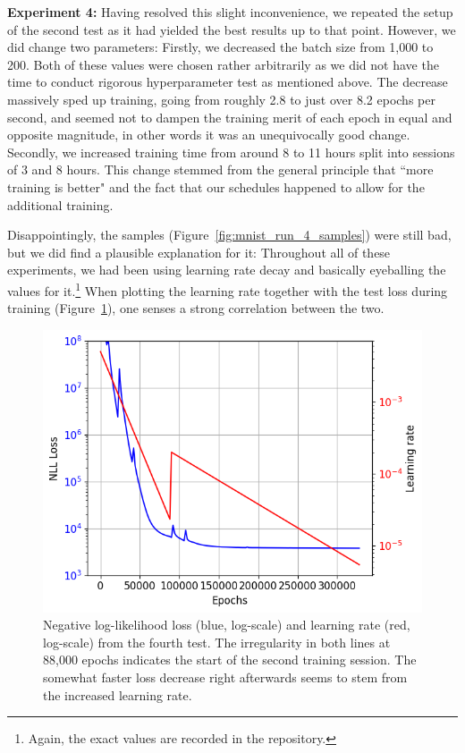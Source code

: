 \textbf{Experiment 4:} Having resolved this slight inconvenience, we repeated the setup of the second test as it had yielded the best results up to that point. However, we did change two parameters: Firstly, we decreased the batch size from 1,000 to 200. Both of these values were chosen rather arbitrarily as we did not have the time to conduct rigorous hyperparameter test as mentioned above. The decrease massively sped up training, going from roughly 2.8 to just over 8.2 epochs per second, and seemed not to dampen the training merit of each epoch in equal and opposite magnitude, in other words it was an unequivocally good change. Secondly, we increased training time from around 8 to 11 hours split into sessions of 3 and 8 hours. This change stemmed from the general principle that ``more training is better" and the fact that our schedules happened to allow for the additional training.

Disappointingly, the samples (Figure~\ref{fig:mnist_run_4_samples}) were still bad, but we did find a plausible explanation for it: Throughout all of these experiments, we had been using learning rate decay and basically eyeballing the values for it.\footnote{Again, the exact values are recorded in the repository.} When plotting the learning rate together with the test loss during training (Figure~\ref{fig:mnist_run_4_loss_vs_lr}), one senses a strong correlation between the two.

\begin{figure}
\centering
\includegraphics[width=.65\textwidth]{images/mnist_maxpooling/run_4_loss_vs_lr.png}
\caption{Negative log-likelihood loss (blue, log-scale) and learning rate (red, log-scale) from the fourth test. The irregularity in both lines at 88,000 epochs indicates the start of the second training session. The somewhat faster loss decrease right afterwards seems to stem from the increased learning rate.}
\label{fig:mnist_run_4_loss_vs_lr}
\end{figure}

